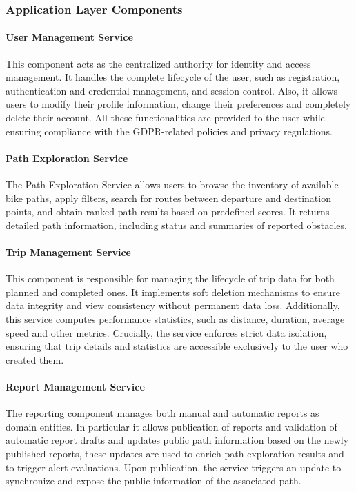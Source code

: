 \subsubsection{Application Layer Components}
\paragraph{User Management Service} 
This component acts as the centralized authority for identity and access management. It handles the complete lifecycle of the user, such as registration, authentication and credential management, and session control. Also, it allows users to modify their profile information, change their preferences and completely delete their account. All these functionalities are provided to the user while ensuring compliance with the GDPR-related policies and privacy regulations.

\paragraph{Path Exploration Service} 
The Path Exploration Service allows users to browse the inventory of available bike paths, apply filters, search for routes between departure and destination points, and obtain ranked path results based on predefined scores. It returns detailed path information, including status and summaries of reported obstacles.

\paragraph{Trip Management Service}
This component is responsible for managing the lifecycle of trip data for both planned and completed ones. It implements soft deletion mechanisms to ensure data integrity and view consistency without permanent data loss. Additionally, this service computes performance statistics, such as distance, duration, average speed and other metrics. Crucially, the service enforces strict data isolation, ensuring that trip details and statistics are accessible exclusively to the user who created them.

\paragraph{Report Management Service}
The reporting component manages both manual and automatic reports as domain entities. In particular it allows publication of reports and validation of automatic report drafts and updates public path information based on the newly published reports, these updates are used to enrich path exploration results and to trigger alert evaluations. Upon publication, the service triggers an update to synchronize and expose the public information of the associated path.

